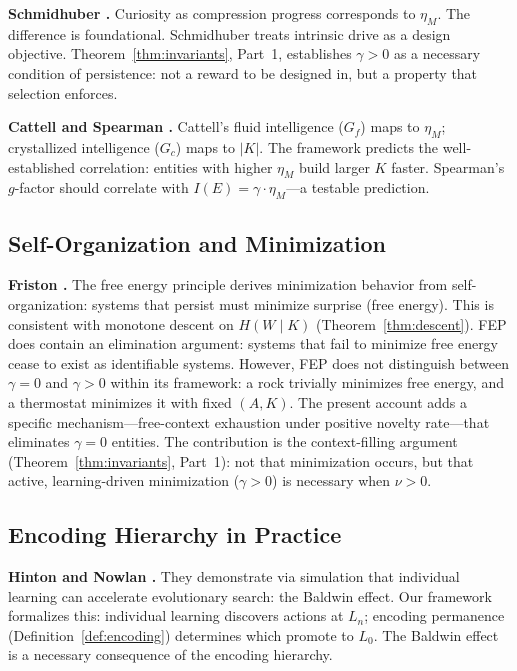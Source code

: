 \documentclass[11pt]{article}
\theoremstyle{definition}
\theoremstyle{remark}
\begin{document}
\textbf{Schmidhuber \cite{Schmidhuber2010}.}
Curiosity as compression progress corresponds to $\eta_M$. The
difference is foundational. Schmidhuber treats intrinsic drive as a
design objective. Theorem~\ref{thm:invariants}, Part~1, establishes
$\gamma > 0$ as a necessary condition of persistence: not a reward to
be designed in, but a property that selection enforces.

\textbf{Cattell \cite{Cattell1971} and Spearman \cite{Spearman1904}.}
Cattell's fluid intelligence ($G_f$) maps to $\eta_M$; crystallized
intelligence ($G_c$) maps to $|K|$. The framework predicts the
well-established correlation: entities with higher $\eta_M$ build
larger $K$ faster. Spearman's $g$-factor should correlate with
$I(E) = \gamma \cdot \eta_M$---a testable prediction.

\subsection{Self-Organization and Minimization}

\textbf{Friston \cite{Friston2010, Friston2017}.}
The free energy principle derives minimization behavior from
self-organization: systems that persist must minimize surprise (free
energy). This is consistent with monotone descent on $H(W \mid K)$
(Theorem~\ref{thm:descent}). FEP does contain an elimination
argument: systems that fail to minimize free energy cease to exist as
identifiable systems. However, FEP does not distinguish between
$\gamma = 0$ and $\gamma > 0$ within its framework: a rock trivially
minimizes free energy, and a thermostat minimizes it with fixed
$(A, K)$. The present account adds a specific mechanism---free-context
exhaustion under positive novelty rate---that eliminates $\gamma = 0$
entities. The contribution is the context-filling argument
(Theorem~\ref{thm:invariants}, Part~1): not that minimization occurs,
but that active, learning-driven minimization ($\gamma > 0$) is
necessary when $\nu > 0$.

\subsection{Encoding Hierarchy in Practice}

\textbf{Hinton and Nowlan \cite{Hinton1987}.}
They demonstrate via simulation that individual learning can accelerate
evolutionary search: the Baldwin effect. Our framework formalizes this:
individual learning discovers actions at $L_n$; encoding permanence
(Definition~\ref{def:encoding}) determines which promote to $L_0$. The
Baldwin effect is a necessary consequence of the encoding hierarchy.
\end{document}
